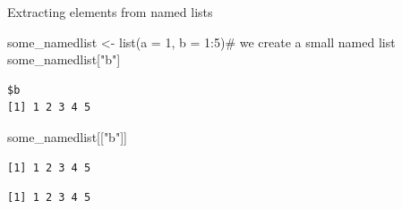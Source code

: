 \documentclass[
  ignorenonframetext,
  aspectratio=169,
]{beamer}
\newenvironment{Shaded}{\begin{snugshade}}{\end{snugshade}}
\newcommand{\AttributeTok}[1]{\textcolor[rgb]{0.40,0.45,0.13}{#1}}
\newcommand{\CommentTok}[1]{\textcolor[rgb]{0.37,0.37,0.37}{#1}}
\newcommand{\DecValTok}[1]{\textcolor[rgb]{0.68,0.00,0.00}{#1}}
\newcommand{\FunctionTok}[1]{\textcolor[rgb]{0.28,0.35,0.67}{#1}}
\newcommand{\NormalTok}[1]{\textcolor[rgb]{0.00,0.23,0.31}{#1}}
\newcommand{\OtherTok}[1]{\textcolor[rgb]{0.00,0.23,0.31}{#1}}
\newcommand{\SpecialCharTok}[1]{\textcolor[rgb]{0.37,0.37,0.37}{#1}}
\newcommand{\StringTok}[1]{\textcolor[rgb]{0.13,0.47,0.30}{#1}}
\begin{document}
\begin{frame}[fragile]{Extracting elements from named lists}
\protect{}\label{extracting-elements-from-named-lists}
\footnotesize

\begin{Shaded}
\begin{Highlighting}[]
\NormalTok{some\_namedlist }\OtherTok{\textless{}{-}} \FunctionTok{list}\NormalTok{(}\AttributeTok{a =} \DecValTok{1}\NormalTok{, }\AttributeTok{b =} \DecValTok{1}\SpecialCharTok{:}\DecValTok{5}\NormalTok{)}\CommentTok{\# we create a small named list}
\NormalTok{some\_namedlist[}\StringTok{"b"}\NormalTok{]}
\end{Highlighting}
\end{Shaded}

\begin{verbatim}
$b
[1] 1 2 3 4 5
\end{verbatim}

\begin{Shaded}
\begin{Highlighting}[]
\NormalTok{some\_namedlist[[}\StringTok{"b"}\NormalTok{]]}
\end{Highlighting}
\end{Shaded}

\begin{verbatim}
[1] 1 2 3 4 5
\end{verbatim}

\begin{Shaded}
\end{Shaded}

\begin{verbatim}
[1] 1 2 3 4 5
\end{verbatim}

\normalsize
\end{frame}
\end{document}
